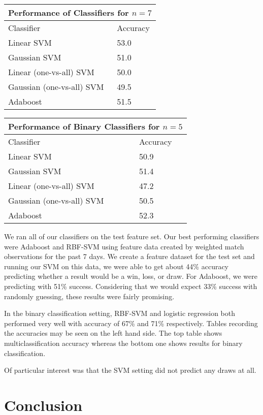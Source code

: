 \documentclass[paper=a4, fontsize=11pt]{scrartcl}
\numberwithin{equation}{section}		%
\numberwithin{figure}{section}			%
\numberwithin{table}{section}				%
\begin{document}
\begin{tabular}{ |p{3cm}||p{3cm}|  }
 \hline
 \multicolumn{2}{|c|}{Performance of Classifiers for $n=7$} \\
 \hline
Classifier & Accuracy \\
 \hline
 Linear SVM   & 53.0 \\
 Gaussian SVM &   51.0 \\
 Linear (one-vs-all) SVM & 50.0 \\
 Gaussian (one-vs-all) SVM    & 49.5 \\
 Adaboost & 51.5 \\
 \hline
\end{tabular}

\begin{tabular}{ |p{3cm}||p{3cm}|  }
 \hline
 \multicolumn{2}{|c|}{Performance of Binary Classifiers for $n=5$} \\
 \hline
Classifier & Accuracy \\
 \hline
 Linear SVM   & 50.9 \\
 Gaussian SVM &   51.4 \\
 Linear (one-vs-all) SVM & 47.2 \\
 Gaussian (one-vs-all) SVM    & 50.5 \\
 Adaboost & 52.3 \\
 \hline
\end{tabular}

We ran all of our classifiers on the test feature set. Our best performing classifiers were Adaboost and RBF-SVM using feature data created by weighted match observations for the past 7 days.  We create a feature dataset for the test set and running our SVM on this data, we were able to get about 44\% accuracy predicting whether a result would be a win, loss, or draw. For Adaboost, we were predicting with 51\% success. Considering that we would expect 33\% success with randomly guessing, these results were fairly promising.

In the binary classification setting, RBF-SVM and logistic regression both performed very well with accuracy of 67\% and 71\% respectively. Tables recording the accuracies may be seen on the left hand side. The top table shows multiclassification accuracy whereas the bottom one shows results for binary classification.

Of particular interest was that the SVM setting did not predict any draws at all.

\section{Conclusion}

\end{document}
